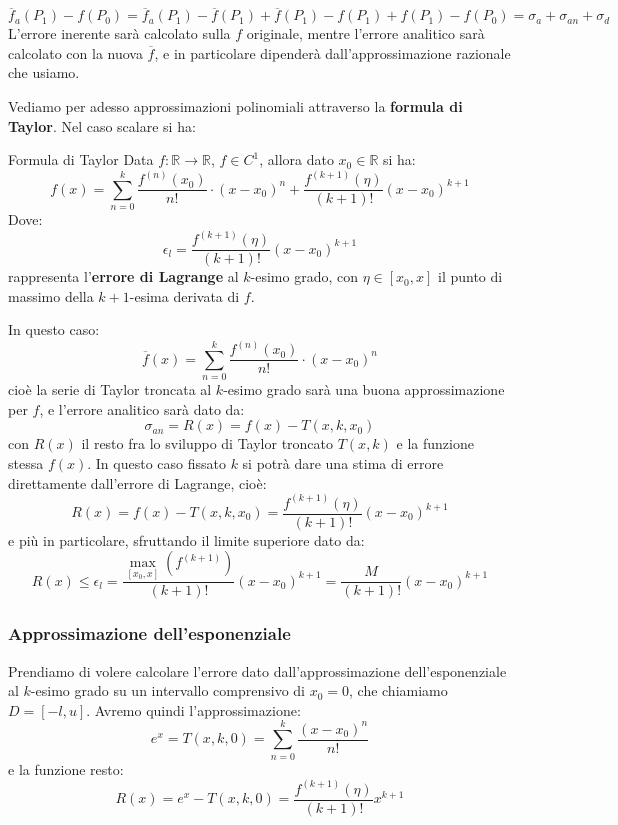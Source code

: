 \documentclass[a4paper,11pt]{article}
\begin{document}
$$
\overline{f}_a (P_1) - f(P_0) = \overline{f}_a (P_1) - \overline{f} (P_1) + \overline{f} (P_1) - f(P_1) + f(P_1) - f(P_0) = \sigma_a + \sigma_{an} + \sigma_d
$$
	L'errore inerente sarà calcolato sulla $f$ originale, mentre l'errore analitico sarà calcolato con la nuova $\overline{f}$, e in particolare dipenderà dall'approssimazione razionale che usiamo.

Vediamo per adesso approssimazioni polinomiali attraverso la \textbf{formula di Taylor}. Nel caso scalare si ha:

\begin{theorem}{Formula di Taylor}
	Data $f : \mathbb{R} \rightarrow \mathbb{R}$, $f \in C^1$, allora dato $x_0 \in \mathbb{R}$ si ha:
	$$
	f(x) = \sum_{n = 0}^k \frac{ f^{(n)}(x_0) }{ n! } \cdot (x - x_0)^n + \frac{ f^{(k + 1)} ( \eta ) }{(k + 1)!} (x - x_0)^{k + 1} 
	$$
	Dove:
	$$
		\epsilon_l = \frac{ f^{(k + 1)} ( \eta ) }{(k + 1)!} (x - x_0)^{k + 1}
	$$
	rappresenta l'\textbf{errore di Lagrange} al $k$-esimo grado, con $\eta \in [x_0, x]$ il punto di massimo della $k + 1$-esima derivata di $f$.
\end{theorem}

In questo caso:
$$
\overline{f}(x) = \sum_{n = 0}^k \frac{ f^{(n)}(x_0) }{ n! } \cdot (x - x_0)^n
$$
cioè la serie di Taylor troncata al $k$-esimo grado sarà una buona approssimazione per $f$, e l'errore analitico sarà dato da:
$$
\sigma_{an} = R(x) = f(x) - T(x, k, x_0) 
$$
		con $R(x)$ il resto fra lo sviluppo di Taylor troncato $T(x, k)$ e la funzione stessa $f(x)$.
In questo caso fissato $k$ si potrà dare una stima di errore direttamente dall'errore di Lagrange, cioè:
$$
R(x) = f(x) - T(x, k, x_0) = \frac{ f^{(k + 1)} ( \eta ) }{(k + 1)!} (x - x_0)^{k + 1}
$$
e più in particolare, sfruttando il limite superiore dato da:
$$
R(x) \leq \epsilon_l = \frac{ \max_{[x_0, x]} \left( f^{(k + 1)} \right) }{(k + 1)!} (x - x_0)^{k + 1} = \frac{M}{(k + 1)!}(x - x_0)^{k + 1}
$$

\subsubsection{Approssimazione dell'esponenziale}
Prendiamo di volere calcolare l'errore dato dall'approssimazione dell'esponenziale al $k$-esimo grado su un intervallo comprensivo di $x_0 = 0$, che chiamiamo $D = [-l, u]$.
Avremo quindi l'approssimazione:
$$
e^x = T(x, k, 0) = \sum_{n = 0}^k \frac{(x - x_0)^n}{n!}
$$
e la funzione resto:
$$
R(
x) = e^x - T(x, k, 0) = \frac{f^{(k + 1)}(\eta)}{(k + 1)!}x^{k + 1}
$$
\end{document}
